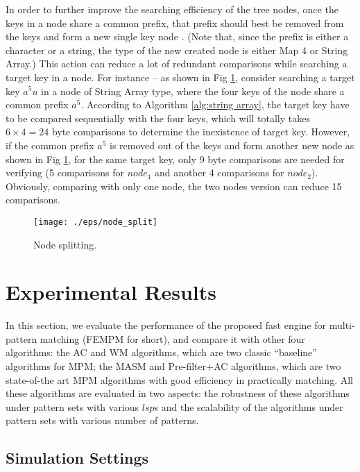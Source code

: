 \documentclass{article}
\begin{document}
In order to further improve the searching efficiency of the tree
nodes, once the keys in a node share a common prefix, that prefix
should best be removed from the keys and form a new single key node
. (Note that, since the prefix is either a character or a string, the
type of the new created node is either Map 4 or String Array.)  This
action can reduce a lot of redundant comparisons while searching a
target key in a node. For instance -- as shown in Fig \ref{fig:split},
consider searching a target key $a^5u$ in a node of String Array type,
where the four keys of the node share a common prefix $a^5$. According
to Algorithm \ref{alg:string array}, the target key have to be
compared sequentially with the four keys, which will totally takes
$6 \times 4 = 24$ byte comparisons to determine the inexistence of
target key. However, if the common prefix $a^5$ is removed out of the
keys and form another new node as shown in Fig \ref{fig:split}, for
the same target key, only 9 byte comparisons are needed for verifying
(5 comparisons for $node_1$ and another 4 comparisons for
$node_2$). Obviously, comparing with only one node, the two nodes
version can reduce 15 comparisons.

\begin{figure}[htbp]
  \centering
  \texttt{[image: ./eps/node\_split]}
  \caption{Node splitting.}
  \label{fig:split}
\end{figure}



\section{Experimental Results}
\label{sec:experiments}

In this section, we evaluate the performance of the proposed fast
engine for multi-pattern matching (\textsf{FEMPM} for short), and
compare it with other four algorithms: the \textsf{AC} and \textsf{WM}
algorithms, which are two classic ``baseline'' algorithms for MPM; the
\textsf{MASM} and \textsf{Pre-filter+AC} algorithms, which are two
state-of-the art MPM algorithms with good efficiency in practically
matching. All these algorithms are evaluated in two aspects: the
robustness of these algorithms under pattern sets with various $lsp$s
and the scalability of the algorithms under pattern sets with various
number of patterns.

\subsection{Simulation Settings}
\end{document}
